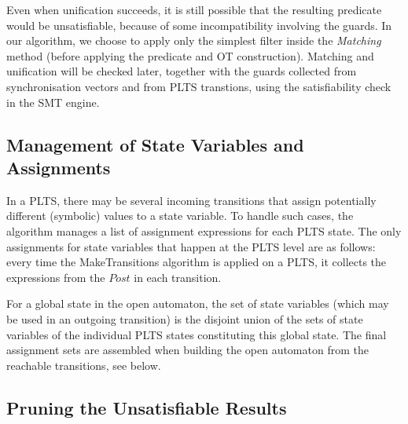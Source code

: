 \documentclass[smallcondensed]{svjour3}
\newcommand{\QIN}[1]{\textcolor{airforceblue}{#1}}
\begin{document}
Even when unification succeeds, it is still possible that
the resulting predicate would be unsatisfiable, because of some
incompatibility involving the guards. In our algorithm, we choose to
apply only the simplest filter inside the \emph{Matching} method
(before applying the predicate and OT construction). Matching and
unification  will be checked later, together with the guards collected
from synchronisation vectors and from PLTS transtions, using the
satisfiability check in the SMT engine.


\subsection{Management of State Variables and Assignments}


In a PLTS, there may be several incoming transitions 
that assign potentially different (symbolic) values to a state variable.
To handle such cases, the algorithm manages a
list of assignment expressions for each PLTS state. 
The only assignments for state variables that happen at the PLTS level
are as follows: every time the MakeTransitions 
algorithm is applied on a PLTS, it collects the expressions from the
$Post$ in each transition. 

For a global state in the open automaton, the set of state
variables (which may be used in an outgoing transition) 
is the disjoint union
of the sets of state variables of the individual PLTS states constituting this
global state. The final assignment sets are assembled when building the
open automaton from the reachable transitions, see below.



\subsection{Pruning the Unsatisfiable Results}
\label{section:pruning}
\end{document}
